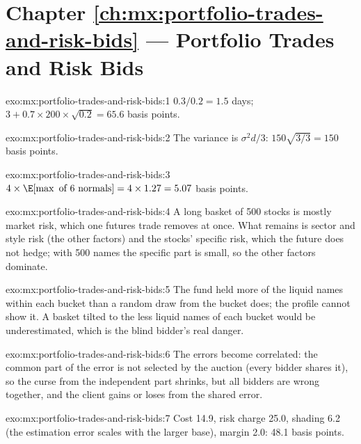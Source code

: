 \section*{Chapter \ref{ch:mx:portfolio-trades-and-risk-bids} --- Portfolio Trades and Risk Bids}

\begin{solution}{exo:mx:portfolio-trades-and-risk-bids:1}
$0.3/0.2=1.5$ days; $3+0.7\times200\times\sqrt{0.2}=65.6$ basis points.
\end{solution}

\begin{solution}{exo:mx:portfolio-trades-and-risk-bids:2}
The variance is $\sigma^2d/3$: $150\sqrt{3/3}=150$ basis points.
\end{solution}

\begin{solution}{exo:mx:portfolio-trades-and-risk-bids:3}
$4\times\E[\max\text{ of 6 normals}]=4\times1.27=5.07$ basis points.
\end{solution}

\begin{solution}{exo:mx:portfolio-trades-and-risk-bids:4}
A long basket of 500 stocks is mostly market risk, which one futures trade removes at once. What remains is sector and style risk (the other
factors) and the stocks' specific risk, which the future does not hedge; with 500 names the specific part is small, so the other factors dominate.
\end{solution}

\begin{solution}{exo:mx:portfolio-trades-and-risk-bids:5}
The fund held more of the liquid names within each bucket than a random draw from the bucket does; the profile cannot show it. A basket tilted to the
less liquid names of each bucket would be underestimated, which is the blind bidder's real danger.
\end{solution}

\begin{solution}{exo:mx:portfolio-trades-and-risk-bids:6}
The errors become correlated: the common part of the error is not selected by the auction (every bidder shares it), so the curse from the independent
part shrinks, but all bidders are wrong together, and the client gains or loses from the shared error.
\end{solution}

\begin{solution}{exo:mx:portfolio-trades-and-risk-bids:7}
Cost 14.9, risk charge 25.0, shading 6.2 (the estimation error scales with the larger base), margin 2.0: 48.1 basis points.
\end{solution}

